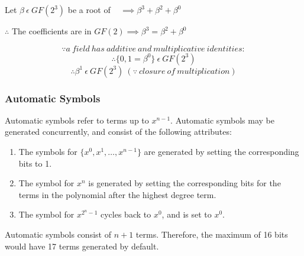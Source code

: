         \hspace*{\fill}
        \centerline{Let $\beta \ \epsilon \ GF(2^{3})$ be a root of
        \examplepoly~ $\implies \beta^{3}+\beta^{2}+\beta^{0}$}

        \hspace*{\fill}
        \centerline{$\therefore$ The coefficients are in $GF(2) \implies
        \beta^{3}=\beta^{2}+\beta^{0}$}
        \[ \because a \ field \ has \ additive \ and \ multiplicative \
        identities: \]
        \[ \therefore \{ 0, 1=\beta^{0} \} \ \epsilon \ GF(2^{3}) \]
        \[ \therefore \beta^{1} \ \epsilon \ GF(2^{3}) \ (\because \ closure \
        of \ multiplication) \]

    \subsubsection{Automatic Symbols}

    Automatic symbols refer to terms up to $x^{n-1}$. Automatic symbols may be
    generated concurrently, and consist of the following attributes:
    \begin{enumerate}
        \item The symbols for $\{x^{0}, x^{1}, \ldots, x^{n-1}\}$ are generated
        by setting the corresponding bits to 1.
        \item The symbol for $x^{n}$ is generated by setting the corresponding
        bits for the terms in the polynomial after the highest degree term.
        \item The symbol for $x^{2^{n}-1}$ cycles back to $x^{0}$, and is set
        to $x^{0}$.
    \end{enumerate}

        Automatic symbols consist of $n+1$ terms. Therefore, the maximum of 16
        bits would have 17 terms generated by default.

